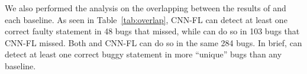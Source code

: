 We also performed the analysis on the overlapping between the results
of {\tool} and each baseline. As seen in Table~\ref{tab:overlap},
CNN-FL can detect at least one correct faulty statement in 48 bugs
that {\tool} missed, while {\tool} can do so in 103 bugs that CNN-FL
missed. Both {\tool} and CNN-FL can do so in the same 284 bugs. In
brief, {\tool} can detect at least one correct buggy statement in more
``unique'' bugs than any baseline.











